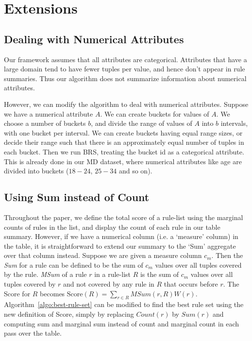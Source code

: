 \documentclass[10pt,journal,compsoc]{IEEEtran}
\newcommand{\techreporttext}[1]{#1}
\begin{document}
\techreporttext{
\section{Extensions}\label{sec:extensions}
\subsection{Dealing with Numerical Attributes}\label{sec:extensions-numerical}
Our framework assumes that all attributes are categorical. Attributes that have a large domain tend to have fewer tuples per value, and hence don't appear in rule summaries. Thus our algorithm does not summarize information about numerical attributes. 

However, we can modify the algorithm to deal with numerical attributes. Suppose we have a numerical attribute $A$. We can create buckets for values of $A$. We choose a number of buckets $b$, and divide the range of values of $A$ into $b$ intervals, with one bucket per interval. We can create buckets having equal range sizes, or decide their range such that there is an approximately equal number of tuples in each bucket. Then we run BRS, treating the bucket id as a categorical attribute. This is already done in our MD dataset, where numerical attributes like age are divided into buckets ($18-24$, $25-34$ and so on).

\subsection{Using Sum instead of Count}\label{sec:extensions-sum}
Throughout the paper, we define the total score of a rule-list using the marginal counts of rules in the list, and display the count of each rule in our table summary. However, if we have a numerical column (i.e. a `measure' column) in the table, it is straightforward to extend our summary to the `Sum' aggregate over that column instead. Suppose we are given a measure column $c_m$. Then the {\em Sum} for a rule can be defined to be the sum of $c_m$ values over all tuples covered by the rule. {\em MSum} of a rule $r$ in a rule-list $R$ is the sum of $c_m$ values over all tuples covered by $r$ and not covered by any rule in $R$ that occurs before $r$. The Score for $R$ becomes $\text{Score}(R) = \sum_{r\in R} MSum(r,R)W(r)$. Algorithm~\ref{algo:best-rule-set} can be modified to find the best rule set using the new definition of Score, simply by replacing $Count(r)$ by $Sum(r)$ and computing sum and marginal sum instead of count and marginal count in each pass over the table.
}
\end{document}
